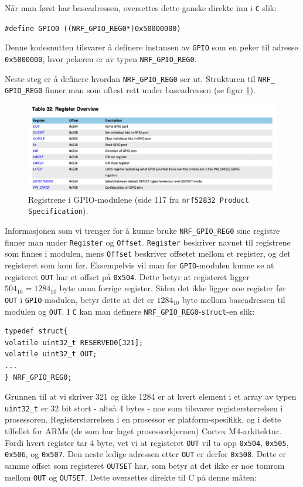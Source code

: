 Når man først har baseadressen, oversettes dette ganske direkte inn i \verb|C| slik:

\verb|#define GPIO0 ((NRF_GPIO_REG0*)0x50000000)|

Denne kodesnutten tilsvarer å definere instansen av \verb|GPIO| som en peker til adresse \verb|0x5000000|, hvor pekeren er av typen \verb|NRF_GPIO_REG0|. 

Neste steg er å definere hvordan \verb|NRF_GPIO_REG0| ser ut. Strukturen til \verb|NRF_ GPIO_REG0| finner man som oftest rett under baseadressen (se figur \ref{fig:app-memory-struct}).

\begin{figure}[ht]
    \centering
    \includegraphics[scale=0.50]{figures/memory_stuff_gpio.png}
    \caption{Registrene i GPIO-modulene (side 117 fra \texttt{nrf52832 Product Specification}).}
    \label{fig:app-memory-struct}
\end{figure}

Informasjonen som vi trenger for å kunne bruke \verb|NRF_GPIO_REG0| sine registre finner man under \verb|Register| og \verb|Offset|. \verb|Register| beskriver navnet til registrene som finnes i modulen, mens \verb|Offset| beskriver offsetet mellom et register, og det registeret som kom før. Eksempelvis vil man for \verb|GPIO|-modulen kunne se at registeret \verb|OUT| har et offset på \verb|0x504|. Dette betyr at registeret ligger $504_{16} = 1284_{10}$ byte unna forrige register. Siden det ikke ligger noe register før \verb|OUT| i \verb|GPIO|-modulen, betyr dette at det er $1284_{10}$ byte mellom baseadressen til modulen og \verb|OUT|. I \verb|C| kan man definere \verb|NRF_GPIO_REG0|-\verb|struct|-en slik:

\begin{lstlisting}
typedef struct{
volatile uint32_t RESERVED0[321];
volatile uint32_t OUT;
...
} NRF_GPIO_REG0;
\end{lstlisting}

Grunnen til at vi skriver 321 og ikke 1284 er at hvert element i et array av typen \verb|uint32_t| er 32 bit stort - altså 4 bytes - noe som tilsvarer registerstørrelsen i prosessoren. Registerstørrelsen i en prosessor er platform-spesifikk, og i dette tilfellet for ARMs  (de som har laget prosessorkjernen) Cortex M4-arkitektur. Fordi hvert register tar 4 byte, vet vi at registeret \verb|OUT| vil ta opp \verb|0x504|, \verb|0x505|, \verb|0x506|, og \verb|0x507|. Den neste ledige adressen etter \verb|OUT| er derfor \verb|0x508|. Dette er samme offset som registeret \verb|OUTSET| har, som betyr at det ikke er noe tomrom mellom \verb|OUT| og \verb|OUTSET|. Dette oversettes direkte til C på denne måten:


